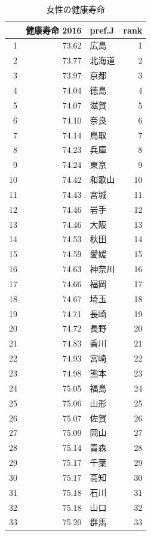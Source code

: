 \begin{table}[ht]
\centering
\footnotesize
\caption{女性の健康寿命}
\begin{tabular}{rrlr}
  \hline
 & 健康寿命 2016 & pref.J & rank \\
  \hline
1 & 73.62 & 広島 &   1 \\
  2 & 73.77 & 北海道 &   2 \\
  3 & 73.97 & 京都 &   3 \\
  4 & 74.04 & 徳島 &   4 \\
  5 & 74.07 & 滋賀 &   5 \\
  6 & 74.10 & 奈良 &   6 \\
  7 & 74.14 & 鳥取 &   7 \\
  8 & 74.23 & 兵庫 &   8 \\
  9 & 74.24 & 東京 &   9 \\
  10 & 74.42 & 和歌山 &  10 \\
  11 & 74.43 & 宮城 &  11 \\
  12 & 74.46 & 岩手 &  12 \\
  13 & 74.46 & 大阪 &  13 \\
  14 & 74.53 & 秋田 &  14 \\
  15 & 74.59 & 愛媛 &  15 \\
  16 & 74.63 & 神奈川 &  16 \\
  17 & 74.66 & 福岡 &  17 \\
  18 & 74.67 & 埼玉 &  18 \\
  19 & 74.71 & 長崎 &  19 \\
  20 & 74.72 & 長野 &  20 \\
  21 & 74.83 & 香川 &  21 \\
  22 & 74.93 & 宮崎 &  22 \\
  23 & 74.98 & 熊本 &  23 \\
  24 & 75.05 & 福島 &  24 \\
  25 & 75.06 & 山形 &  25 \\
  26 & 75.07 & 佐賀 &  26 \\
  27 & 75.09 & 岡山 &  27 \\
  28 & 75.14 & 青森 &  28 \\
  29 & 75.17 & 千葉 &  29 \\
  30 & 75.17 & 高知 &  30 \\
  31 & 75.18 & 石川 &  31 \\
  32 & 75.18 & 山口 &  32 \\
  33 & 75.20 & 群馬 &  33 \\

\end{tabular}
\end{table}
